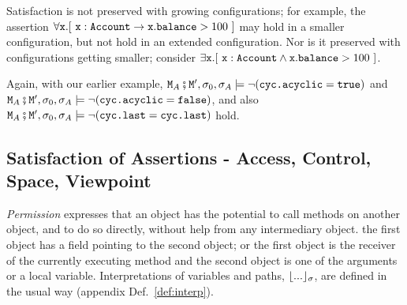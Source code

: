 Satisfaction is not preserved with growing configurations; for example, the assertion $\forall {\mbox{\tt{x}}}. [\ {\mbox{\tt{x}}} : {\mbox{\tt{Account}}} \rightarrow {\mbox{\tt{x}}}.{\mbox{\tt{balance}}}>100\ ]$ 
may hold in a smaller configuration, but not hold in an extended configuration. 
Nor is it preserved with configurations getting smaller; consider \eg $\exists {\mbox{\tt{x}}}. [\ {\mbox{\tt{x}}} : {\mbox{\tt{Account}}} \wedge {\mbox{\tt{x}}}.{\mbox{\tt{balance}}}>100\ ]$.

\noindent
Again, with our earlier example,  
${\mbox{\tt{\ensuremath{{\mbox{\tt{M}}}}}}}_A\fatsemi {\mbox{\tt{\ensuremath{{\mbox{\tt{M}}}}}}}', \sigma_0 , \sigma_A \models \neg ({\mbox{\tt{cyc.acyclic}}}={\mbox{\tt{true}}})$    and  
${\mbox{\tt{\ensuremath{{\mbox{\tt{M}}}}}}}_A\fatsemi {\mbox{\tt{\ensuremath{{\mbox{\tt{M}}}}}}}', \sigma_0 , \sigma_A \models  \neg ({\mbox{\tt{cyc.acyclic}}}={\mbox{\tt{false}}})$, 
and also 
${\mbox{\tt{\ensuremath{{\mbox{\tt{M}}}}}}}_A\fatsemi {\mbox{\tt{\ensuremath{{\mbox{\tt{M}}}}}}}', \sigma_0 , \sigma_A \models  \neg ({\mbox{\tt{cyc.last}}}={\mbox{\tt{cyc.last}}})$
hold.


\subsection{Satisfaction of Assertions - Access, Control, Space, Viewpoint}
\label{sect:pcsv} 

\textit{Permission} expresses that an object has the potential to call
methods on another object, and to do so directly, without  help from any
intermediary object.  the first object has a field pointing to the second object; or
the first object is the receiver of the currently executing method and the second object is one of the 
arguments or a local variable. Interpretations of variables and paths, ${\lfloor{ {...}}\rfloor_{\sigma}}$, are defined
in the usual way (appendix Def.~\ref{def:interp}).


